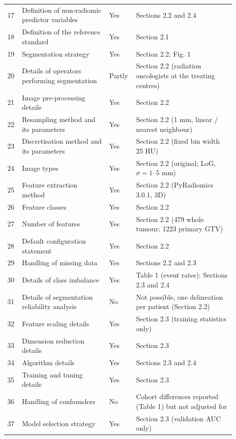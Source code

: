 \begin{longtable}{@{}L{0.06\linewidth}L{0.36\linewidth}L{0.08\linewidth}L{0.415\linewidth}@{}}
17 & Definition of non-radiomic predictor variables & Yes & Sections 2.2 and 2.4 \\
18 & Definition of the reference standard & Yes & Section 2.1 \\
19 & Segmentation strategy & Yes & Section 2.2; Fig. 1 \\
20 & Details of operators performing segmentation & Partly & Section 2.2 (radiation oncologists at the treating centres) \\
21 & Image pre-processing details & Yes & Section 2.2 \\
22 & Resampling method and its parameters & Yes & Section 2.2 (1 mm, linear / nearest neighbour) \\
23 & Discretisation method and its parameters & Yes & Section 2.2 (fixed bin width 25 HU) \\
24 & Image types & Yes & Section 2.2 (original; LoG, $\sigma=1$--5 mm) \\
25 & Feature extraction method & Yes & Section 2.2 (PyRadiomics 3.0.1, 3D) \\
26 & Feature classes & Yes & Section 2.2 \\
27 & Number of features & Yes & Section 2.2 (479 whole tumour; 1223 primary GTV) \\
28 & Default configuration statement & Yes & Section 2.2 \\
29 & Handling of missing data & Yes & Sections 2.2 and 2.3 \\
30 & Details of class imbalance & Yes & Table 1 (event rates); Sections 2.3 and 2.4 \\
31 & Details of segmentation reliability analysis & No & Not possible, one delineation per patient (Section 2.2) \\
32 & Feature scaling details & Yes & Section 2.3 (training statistics only) \\
33 & Dimension reduction details & Yes & Section 2.3 \\
34 & Algorithm details & Yes & Sections 2.3 and 2.4 \\
35 & Training and tuning details & Yes & Section 2.3 \\
36 & Handling of confounders & No & Cohort differences reported (Table 1) but not adjusted for \\
37 & Model selection strategy & Yes & Section 2.3 (validation AUC only) \\

\end{longtable}
